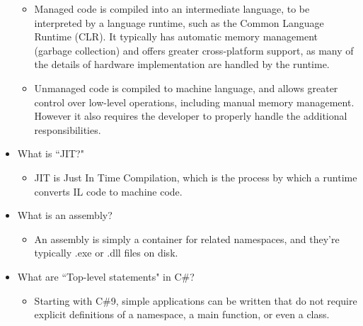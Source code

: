 \documentclass{article}
\begin{document}
\begin{itemize}
\begin{itemize}
        \item Managed code is compiled into an intermediate language, to be interpreted by a language runtime, such as the Common Language Runtime (CLR). It typically has automatic memory management (garbage collection) and offers greater cross-platform support, as many of the details of hardware implementation are handled by the runtime.
        \item Unmanaged code is compiled to machine language, and allows greater control over low-level operations, including manual memory management. However it also requires the developer to properly handle the additional responsibilities.
    \end{itemize}
    \item What is ``JIT?"
    \begin{itemize}
        \item JIT is Just In Time Compilation, which is the process by which a runtime converts IL code to machine code.
    \end{itemize}
    \item What is an assembly?
    \begin{itemize}
        \item An assembly is simply a container for related namespaces, and they're typically .exe or .dll files on disk.
    \end{itemize}
    \item What are ``Top-level statements" in C\#?
    \begin{itemize}
        \item Starting with C\#9, simple applications can be written that do not require explicit definitions of a namespace, a main function, or even a class.
    \end{itemize}
\end{itemize}
\end{document}
